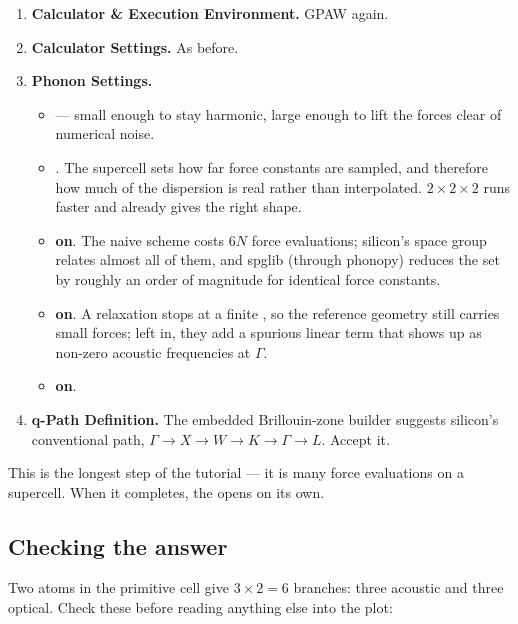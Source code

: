 \begin{enumerate}
  \item \textbf{Calculator \& Execution Environment.} GPAW again.
  \item \textbf{Calculator Settings.} As before.
  \item \textbf{Phonon Settings.}
    \begin{itemize}
      \item {}  --- small enough to stay
        harmonic, large enough to lift the forces clear of numerical noise.
      \item {} . The supercell sets
        how far force constants are sampled, and therefore how much of the
        dispersion is real rather than interpolated. $2\times2\times2$ runs
        faster and already gives the right shape.
      \item {} \textbf{on}. The naive scheme
        costs $6N$ force evaluations; silicon's space group relates almost all
        of them, and spglib (through phonopy) reduces the set by roughly an
        order of magnitude for identical force constants.
      \item {} \textbf{on}. A relaxation stops at a
        finite , so the reference geometry still carries small
        forces; left in, they add a spurious linear term that shows up as
        non-zero acoustic frequencies at $\Gamma$.
      \item {} \textbf{on}.
    \end{itemize}
  \item \textbf{q-Path Definition.} The embedded Brillouin-zone builder
    suggests silicon's conventional path,
    $\Gamma \to X \to W \to K \to \Gamma \to L$. Accept it.
\end{enumerate}

This is the longest step of the tutorial --- it is many force evaluations on a
supercell. When it completes, the  opens on its own.

\subsection{Checking the answer}

Two atoms in the primitive cell give $3 \times 2 = 6$ branches: three acoustic
and three optical. Check these before reading anything else into the plot:

